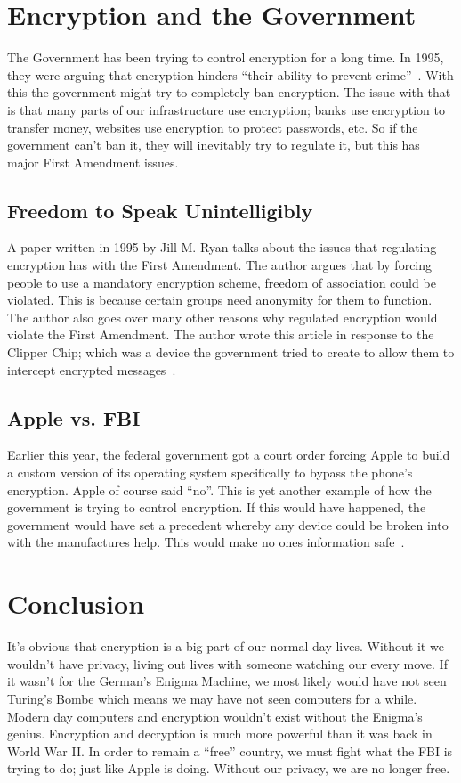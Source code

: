 \documentclass[12pt,a4paper,titlepage]{article}
\begin{document}
\section{Encryption and the Government}
The Government has been trying to control encryption for a long time. In 1995, 
they were arguing that encryption hinders ``their ability to prevent 
crime''~\cite{ryan1995freedom}. With this the government might try to completely
ban encryption. The issue with that is that many parts of our infrastructure use
encryption; banks use encryption to transfer money, websites use encryption to 
protect passwords, etc. So if the government can't ban it, they will inevitably 
try to regulate it, but this has major First Amendment issues.

\subsection{Freedom to Speak Unintelligibly}
A paper written in 1995 by Jill M. Ryan talks about the issues that regulating 
encryption has with the First Amendment. The author argues that by forcing 
people to use a mandatory encryption scheme, freedom of association could be 
violated. This is because certain groups need anonymity for them 
to function. The author also goes over many other reasons why regulated 
encryption would violate the First Amendment. The author wrote this article in 
response to the Clipper Chip; which was a device the government tried to create 
to allow them to intercept encrypted messages~\cite{ryan1995freedom}.

\subsection{Apple vs. FBI}
Earlier this year, the federal government got a court order forcing Apple to build 
a custom version of its operating system specifically to bypass the phone's 
encryption. Apple of course said ``no''. This is yet another example of how the 
government is trying to control encryption. If this would have happened, the 
government would have set a precedent whereby any device could be broken into 
with the manufactures help. This would make no ones information 
safe~\cite{herman2016fbi}.

\section{Conclusion}
It's obvious that encryption is a big part of our normal day lives. Without it
we wouldn't have privacy, living out lives with someone watching our every move.
If it wasn't for the German's Enigma Machine, we most likely would have not seen
Turing's Bombe which means we may have not seen computers for a while. Modern
day computers and encryption wouldn't exist without the Enigma's genius.
Encryption and decryption is much more powerful than it was back in World War II.
In order to remain a ``free'' country, we must fight what the FBI is trying to
do; just like Apple is doing. Without our privacy, we are no longer free.

\newpage

\appendix

\newpage
\printbibliography[
heading=bibintoc,
title={Resources}
]
\end{document}
